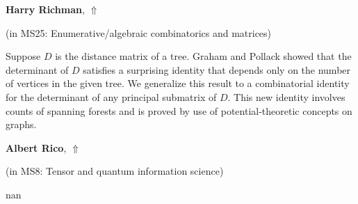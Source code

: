 \documentclass[ILAS2025-program.tex]{subfiles}
\begin{document}
\hypertarget{down0182}{}\begin{ilasabstract}
    
\textbf{Harry Richman},  \hfill \hyperlink{up0182}{$\Uparrow$}
    
    
(in {\color{mstitle}MS25: Enumerative/algebraic combinatorics and matrices})
        
\mtskip
    Suppose $D$ is the distance matrix of a tree. 
Graham and Pollack showed that the determinant of $D$ satisfies a surprising identity that depends only on the number of vertices in the given tree.
We generalize this result to a combinatorial identity for the determinant of any principal submatrix of $D$.
This new identity involves counts of spanning forests and is proved by use of potential-theoretic concepts on graphs.

\end{ilasabstract}
    

\hypertarget{down0284}{}\begin{ilasabstract}
    
\textbf{Albert Rico},  \hfill \hyperlink{up0284}{$\Uparrow$}
    
    
(in {\color{mstitle}MS8: Tensor and quantum information science})
        
\mtskip
    nan
\end{ilasabstract}
    
\end{document}
